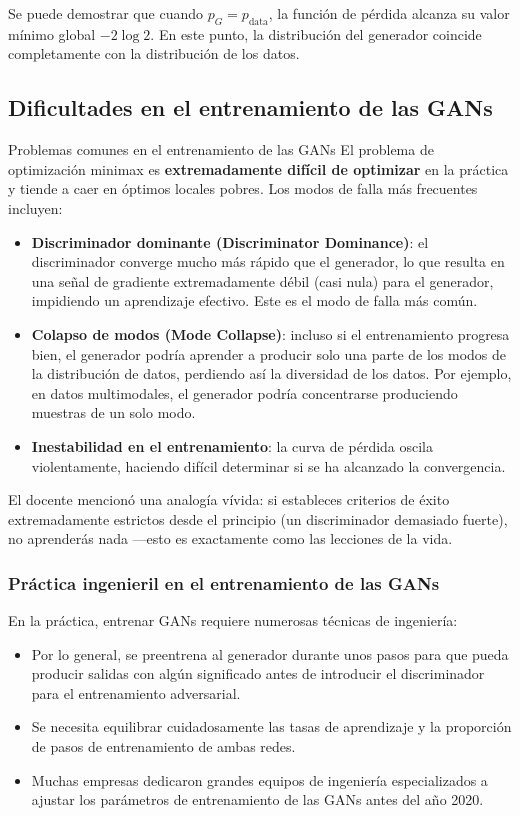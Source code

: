 Se puede demostrar que cuando $p_G = p_{\text{data}}$, la función de pérdida alcanza su valor mínimo global $-2\log 2$. En este punto, la distribución del generador coincide completamente con la distribución de los datos.

\subsection{Dificultades en el entrenamiento de las GANs}

\begin{warningbox}{Problemas comunes en el entrenamiento de las GANs}
El problema de optimización minimax es \textbf{extremadamente difícil de optimizar} en la práctica y tiende a caer en óptimos locales pobres. Los modos de falla más frecuentes incluyen:
\begin{itemize}
    \item \textbf{Discriminador dominante (Discriminator Dominance)}: el discriminador converge mucho más rápido que el generador, lo que resulta en una señal de gradiente extremadamente débil (casi nula) para el generador, impidiendo un aprendizaje efectivo. Este es el modo de falla más común.
    \item \textbf{Colapso de modos (Mode Collapse)}: incluso si el entrenamiento progresa bien, el generador podría aprender a producir solo una parte de los modos de la distribución de datos, perdiendo así la diversidad de los datos. Por ejemplo, en datos multimodales, el generador podría concentrarse produciendo muestras de un solo modo.
    \item \textbf{Inestabilidad en el entrenamiento}: la curva de pérdida oscila violentamente, haciendo difícil determinar si se ha alcanzado la convergencia.
\end{itemize}
\end{warningbox}

El docente mencionó una analogía vívida: si estableces criterios de éxito extremadamente estrictos desde el principio (un discriminador demasiado fuerte), no aprenderás nada —esto es exactamente como las lecciones de la vida.

\subsubsection{Práctica ingenieril en el entrenamiento de las GANs}

En la práctica, entrenar GANs requiere numerosas técnicas de ingeniería:

\begin{itemize}
    \item Por lo general, se preentrena al generador durante unos pasos para que pueda producir salidas con algún significado antes de introducir el discriminador para el entrenamiento adversarial.
    \item Se necesita equilibrar cuidadosamente las tasas de aprendizaje y la proporción de pasos de entrenamiento de ambas redes.
    \item Muchas empresas dedicaron grandes equipos de ingeniería especializados a ajustar los parámetros de entrenamiento de las GANs antes del año 2020.
\end{itemize}

